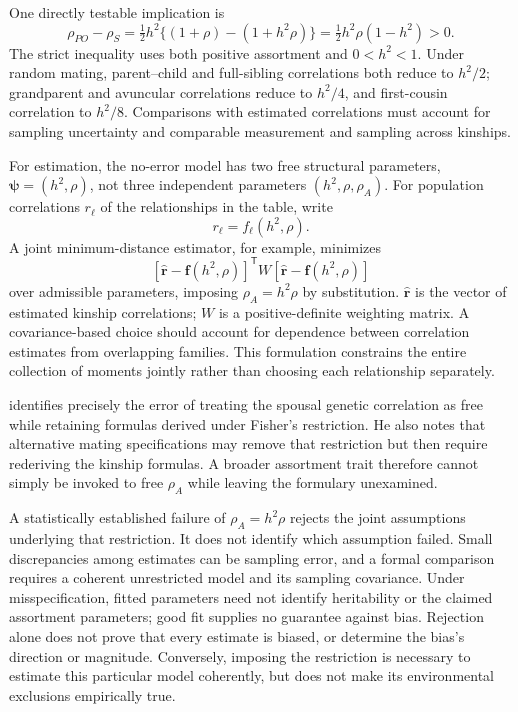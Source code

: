 One directly testable implication is
\begin{equation}
 \rho_{PO}-\rho_S
 =\tfrac12h^2\{(1+\rho)-(1+h^2\rho)\}
 =\boxed{\tfrac12h^2\rho(1-h^2)>0}.
 \label{eq:gap}
\end{equation}
The strict inequality uses both positive assortment and
$0<h^2<1$. Under random mating, parent--child and full-sibling
correlations both reduce to $h^2/2$; grandparent and avuncular
correlations reduce to $h^2/4$, and first-cousin correlation to $h^2/8$.
Comparisons with estimated correlations must account for sampling
uncertainty and comparable measurement and sampling across kinships.

For estimation, the no-error model has two free structural parameters,
$\boldsymbol\psi=(h^2,\rho)$, not three independent parameters
$(h^2,\rho,\rho_A)$. For population correlations $r_\ell$ of the
relationships in the table, write
\[
 r_\ell=f_\ell(h^2,\rho).
\]
A joint minimum-distance estimator, for example, minimizes
\[
 [\widehat{\boldsymbol r}-\boldsymbol f(h^2,\rho)]^{\mathsf T}
 W[\widehat{\boldsymbol r}-\boldsymbol f(h^2,\rho)]
\]
over admissible parameters, imposing $\rho_A=h^2\rho$ by substitution.
$\widehat{\boldsymbol r}$ is the vector of estimated kinship correlations;
$W$ is a positive-definite weighting matrix. A covariance-based choice
should account for dependence between correlation estimates from
overlapping families. This formulation constrains the entire collection
of moments jointly rather than choosing each relationship separately.

\citet[p.~19]{Goldberger1978} identifies precisely the error of treating
the spousal genetic correlation as free while retaining formulas
derived under Fisher's restriction. He also notes that alternative
mating specifications may remove that restriction but then require
rederiving the kinship formulas. A broader assortment trait therefore
cannot simply be invoked to free $\rho_A$ while leaving the formulary
unexamined.

A statistically established failure of $\rho_A=h^2\rho$ rejects the
joint assumptions underlying that restriction. It does not identify
which assumption failed. Small discrepancies among estimates can be
sampling error, and a formal comparison requires a coherent unrestricted
model and its sampling covariance. Under misspecification, fitted
parameters need not identify heritability or the claimed assortment
parameters; good fit supplies no guarantee against bias. Rejection
alone does not prove that every estimate is biased, or determine the
bias's direction or magnitude. Conversely, imposing the restriction is
necessary to estimate this particular model coherently, but does not
make its environmental exclusions empirically true.

